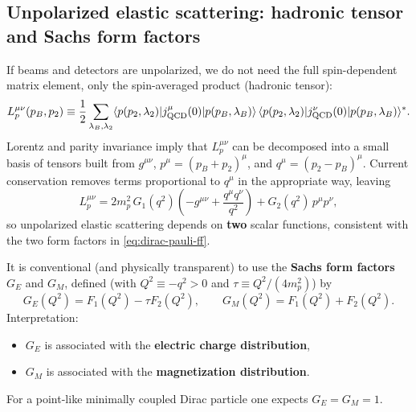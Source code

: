 \subsection{Unpolarized elastic scattering: hadronic tensor and Sachs form factors}
If beams and detectors are unpolarized, we do not need the full spin-dependent matrix element,
only the spin-averaged product (hadronic tensor):
\begin{equation}
L^{\mu\nu}_p(p_B,p_2)
\equiv \frac12 \sum_{\lambda_B,\lambda_2}
\langle p(p_2,\lambda_2)|j^\mu_{\rm QCD}(0)|p(p_B,\lambda_B)\rangle\,
\langle p(p_2,\lambda_2)|j^\nu_{\rm QCD}(0)|p(p_B,\lambda_B)\rangle^\ast .
\end{equation}
Lorentz and parity invariance imply that $L^{\mu\nu}_p$ can be decomposed into a small
basis of tensors built from $g^{\mu\nu}$, $p^\mu=(p_B+p_2)^\mu$, and $q^\mu=(p_2-p_B)^\mu$.
Current conservation removes terms proportional to $q^\mu$ in the appropriate way, leaving
\begin{equation}
L^{\mu\nu}_p
= 2m_p^2\,G_1(q^2)\left(-g^{\mu\nu}+\frac{q^\mu q^\nu}{q^2}\right)
+ G_2(q^2)\,p^\mu p^\nu,
\end{equation}
so unpolarized elastic scattering depends on \textbf{two} scalar functions, consistent
with the two form factors in \eqref{eq:dirac-pauli-ff}.

It is conventional (and physically transparent) to use the \textbf{Sachs form factors}
$G_E$ and $G_M$, defined (with $Q^2\equiv -q^2>0$ and $\tau\equiv Q^2/(4m_p^2)$) by
\begin{equation}
G_E(Q^2)=F_1(Q^2)-\tau F_2(Q^2),
\qquad
G_M(Q^2)=F_1(Q^2)+F_2(Q^2).
\end{equation}
Interpretation:
\begin{itemize}
  \item $G_E$ is associated with the \textbf{electric charge distribution},
  \item $G_M$ is associated with the \textbf{magnetization distribution}.
\end{itemize}
For a point-like minimally coupled Dirac particle one expects $G_E=G_M=1$.

